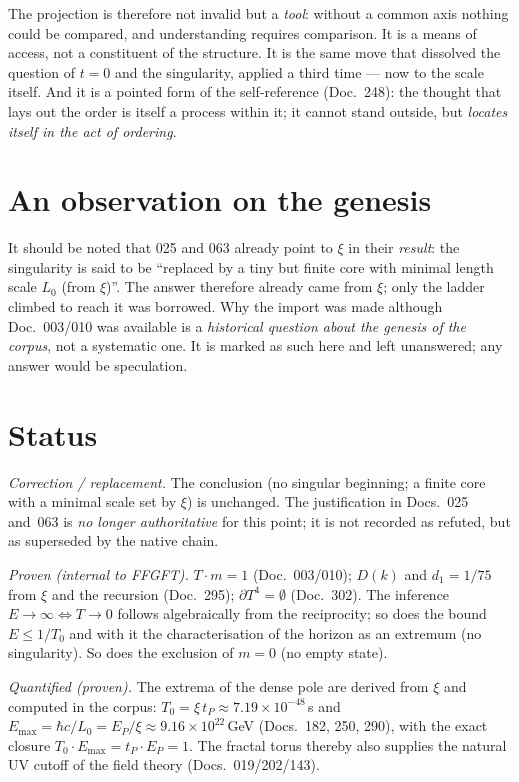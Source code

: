The projection is therefore not invalid but a \emph{tool}: without a common axis nothing could be
compared, and understanding requires comparison. It is a means of access, not a constituent of the
structure. It is the same move that dissolved the question of $t=0$ and the singularity, applied a
third time --- now to the scale itself. And it is a pointed form of the self-reference (Doc.~248):
the thought that lays out the order is itself a process within it; it cannot stand outside, but
\emph{locates itself in the act of ordering}.

\section{An observation on the genesis}

It should be noted that 025 and 063 already point to $\xi$ in their \emph{result}: the singularity is
said to be \enquote{replaced by a tiny but finite core with minimal length scale $L_0$ (from
$\xi$)}. The answer therefore already came from $\xi$; only the ladder climbed to reach it was
borrowed. Why the import was made although Doc.~003/010 was available is a \emph{historical
question about the genesis of the corpus}, not a systematic one. It is marked as such here and
left unanswered; any answer would be speculation.

\section{Status}

\emph{Correction / replacement.} The conclusion (no singular beginning; a finite core with a
minimal scale set by $\xi$) is unchanged. The justification in Docs.~025 and~063 is \emph{no
longer authoritative} for this point; it is not recorded as refuted, but as superseded by the
native chain.

\emph{Proven (internal to FFGFT).} $T\cdot m = 1$ (Doc.~003/010); $D(k)$ and $d_1 = 1/75$ from
$\xi$ and the recursion (Doc.~295); $\partial T^4 = \emptyset$ (Doc.~302). The inference
$E\to\infty \Leftrightarrow T\to 0$ follows algebraically from the reciprocity; so does the bound
$E\le 1/T_0$ and with it the characterisation of the horizon as an extremum (no singularity). So does the exclusion of $m=0$ (no empty state).

\emph{Quantified (proven).} The extrema of the dense pole are derived from $\xi$ and computed in
the corpus: $T_0 = \xi\,t_P \approx 7.19\times10^{-48}$\,s and $E_\text{max} = \hbar c/L_0 = E_P/\xi
\approx 9.16\times10^{22}$\,GeV (Docs.~182, 250, 290), with the exact closure
$T_0\cdot E_\text{max} = t_P\cdot E_P = 1$. The fractal torus thereby also supplies the natural UV
cutoff of the field theory (Docs.~019/202/143).

